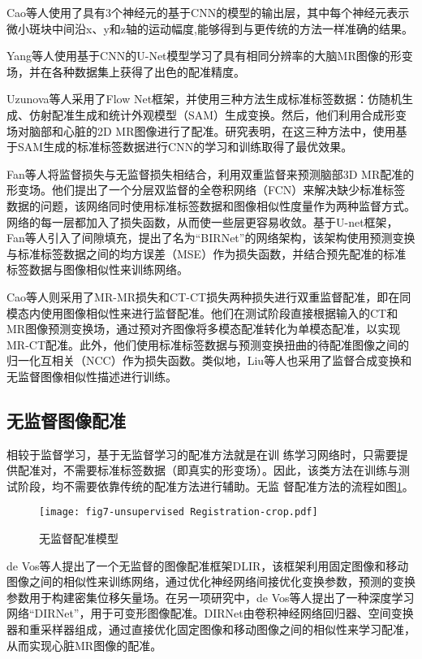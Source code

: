 Cao等人\cite{cao2018deep}使用了具有3个神经元的基于CNN的模型的输出层，其中每个神经元表示微小斑块中间沿x、y和z轴的运动幅度,能够得到与更传统的方法一样准确的结果。

Yang等人使用基于CNN的U-Net模型学习了具有相同分辨率的大脑MR图像的形变场，并在各种数据集上获得了出色的配准精度\cite{yang2017quicksilver}。

Uzunova等人采用了Flow Net框架\cite{dosovitskiy2015flownet}，并使用三种方法生成标准标签数据\cite{uzunova2017training}：仿随机生成、仿射配准生成和统计外观模型（SAM）生成变换。然后，他们利用合成形变场对脑部和心脏的2D MR图像进行了配准。研究表明，在这三种方法中，使用基于SAM生成的标准标签数据进行CNN的学习和训练取得了最优效果。

Fan等人将监督损失与无监督损失相结合，利用双重监督来预测脑部3D MR配准的形变场。他们提出了一个分层双监督的全卷积网络（FCN）\cite{long2015fully}来解决缺少标准标签数据的问题\cite{fan2019birnet}，该网络同时使用标准标签数据和图像相似性度量作为两种监督方式。网络的每一层都加入了损失函数，从而使一些层更容易收敛。基于U-net框架\cite{ronneberger2015u}，Fan等人引入了间隙填充，提出了名为“BIRNet”的网络架构，该架构使用预测变换与标准标签数据之间的均方误差（MSE）作为损失函数，并结合预先配准的标准标签数据与图像相似性来训练网络。

Cao等人则采用了MR-MR损失和CT-CT损失两种损失进行双重监督配准\cite{cao2018deep}，即在同模态内使用图像相似性来进行监督配准。他们在测试阶段直接根据输入的CT和MR图像预测变换场，通过预对齐图像将多模态配准转化为单模态配准，以实现MR-CT配准。此外，他们使用标准标签数据与预测变换扭曲的待配准图像之间的归一化互相关（NCC）作为损失函数。类似地，Liu等人也采用了监督合成变换和无监督图像相似性描述进行训练\cite{liu2019multimodal}。

\subsection{无监督图像配准}

相较于监督学习，基于无监督学习的配准方法就是在训 练学习网络时，只需要提供配准对，不需要标准标签数据（即真实的形变场）。因此，该类方法在训练与测试阶段，均不需要依靠传统的配准方法进行辅助。无监 督配准方法的流程如图\ref{fig:7}。

\begin{figure}[h]
    \centering
    \texttt{[image: fig7-unsupervised Registration-crop.pdf]}
    \caption{无监督配准模型}
    \label{fig:7}
\end{figure}

de Vos等人提出了一个无监督的图像配准框架DLIR\cite{de2019deep}，该框架利用固定图像和移动图像之间的相似性来训练网络，通过优化神经网络间接优化变换参数，预测的变换参数用于构建密集位移矢量场。在另一项研究中，de Vos等人提出了一种深度学习网络“DIRNet”\cite{de2017end}，用于可变形图像配准。DIRNet由卷积神经网络回归器、空间变换器和重采样器组成，通过直接优化固定图像和移动图像之间的相似性来学习配准，从而实现心脏MR图像的配准。

